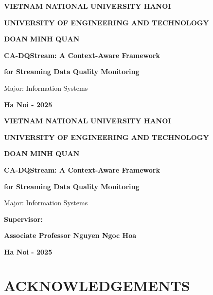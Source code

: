\documentclass[a4paper, reqno, oneside]{book}
\begin{document}
\hypersetup{pageanchor=false}
\begin{titlepage}
\thispagestyle{empty}
\thisfancypage{\doublebox}{}

\centerline{\bf VIETNAM NATIONAL UNIVERSITY HANOI}
\centerline{\bf UNIVERSITY OF ENGINEERING AND TECHNOLOGY}

\vspace*{2cm}
\begin{figure}[H]
\centering
\vspace{2cm}
\end{figure}

\centerline{\bf DOAN MINH QUAN}
\vspace*{3cm}
\centerline{\bf CA-DQStream: A Context-Aware Framework}
\centerline{\bf for Streaming Data Quality Monitoring}
\vspace*{3cm}
\centerline{Major: Information Systems}

\vfill
\centerline{\bf Ha Noi - 2025}
\vspace{8pt}
\end{titlepage}

\newpage
{}
\thispagestyle{empty}
\thisfancypage{\doublebox}{}
\normalsize
\centerline{\bf VIETNAM NATIONAL UNIVERSITY HANOI}
\centerline{\bf UNIVERSITY OF ENGINEERING AND TECHNOLOGY}
\vspace*{3cm}
\large
\centerline{\bf DOAN MINH QUAN}
\vspace*{3cm}
\centerline{\bf CA-DQStream: A Context-Aware Framework}
\centerline{\bf for Streaming Data Quality Monitoring}
\vspace*{2cm}
\centerline{Major: Information Systems}

\vspace*{2cm}

\vspace*{2cm}
\centerline{\bf Supervisor: }
\centerline{\bf Associate Professor Nguyen Ngoc Hoa }

\vfill
\centerline{\bf Ha Noi - 2025}
\vspace{8pt}
\hypersetup{pageanchor=true}
\normalsize



\chapter*{ACKNOWLEDGEMENTS}
\vspace{20pt}
\end{document}
